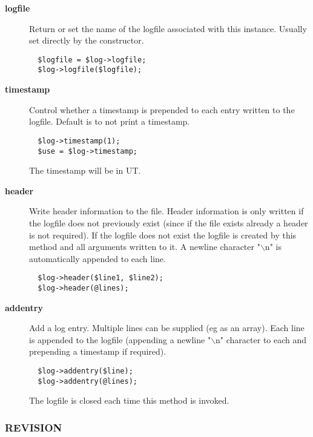 \begin{description}
\begin{description}
\item[{\textbf{logfile}}] \mbox{}

Return or set the name of the logfile associated with
this instance. Usually set directly by the constructor.

\begin{verbatim}
  $logfile = $log->logfile;
  $log->logfile($logfile);
\end{verbatim}

\item[{\textbf{timestamp}}] \mbox{}

Control whether a timestamp is prepended to each entry
written to the logfile. Default is to not print a timestamp.

\begin{verbatim}
  $log->timestamp(1);
  $use = $log->timestamp;
\end{verbatim}


The timestamp will be in UT.


\item[{\textbf{header}}] \mbox{}

Write header information to the file. Header information is only
written if the logfile does not previously exist (since if the file
exists already a header is not required). If the logfile does not
exist the logfile is created by this method and all arguments written
to it.  A newline character "$\backslash$n" is automatically appended to each
line.

\begin{verbatim}
  $log->header($line1, $line2);
  $log->header(@lines);
\end{verbatim}

\item[{\textbf{addentry}}] \mbox{}

Add a log entry. Multiple lines can be supplied (eg as an array).
Each line is appended to the logfile (appending a newline "$\backslash$n"
character to each and prepending a timestamp if required).

\begin{verbatim}
  $log->addentry($line);
  $log->addentry(@lines);
\end{verbatim}


The logfile is closed each time this method is invoked.

\end{description}
\subsubsection*{REVISION\label{ORAC::LogFile_REVISION}}



\end{description}
